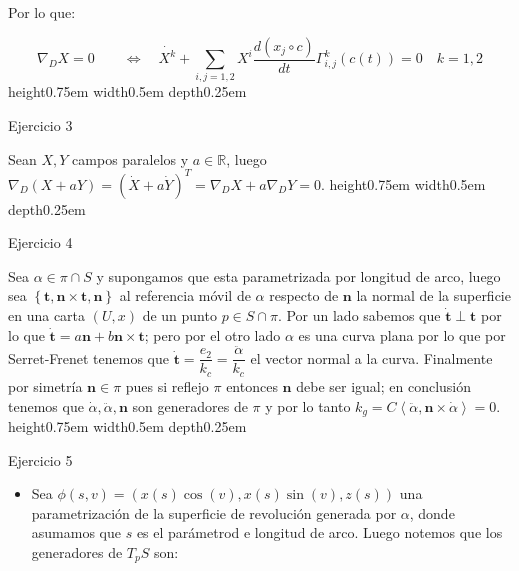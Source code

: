 \documentclass[11pt]{article}
\newcommand{\R}{{\mathbb{R}}}
\newcommand\ip[1]{\left\langle#1\right\rangle}
\renewcommand\tt{\mathbf{t}}
\newcommand\nn{\mathbf{n}}
\newcommand{\sett}[1]{\left\lbrace#1\right\rbrace}
\newcommand{\Bigsum}[2]{\sum\limits_{#1}{#2}}
\newenvironment{proof}[1][Demostraci\'on]{\begin{trivlist}
		\item[\hskip \labelsep {\bfseries #1}]}{\end{trivlist}}
\newcommand{\qed}{\nobreak \ifvmode \relax \else
	\ifdim\lastskip<1.5em \hskip-\lastskip
	\hskip1.5em plus0em minus0.5em \fi \nobreak
	\vrule height0.75em width0.5em depth0.25em\fi}
\begin{document}
\begin{enumerate}
\begin{proof}
		Por lo que:
		
		
		\begin{equation*}
		\nabla_D X = 0 \qquad \Longleftrightarrow \quad \dot{X^k} + \Bigsum{i,j = 1,2}{ X^i \dfrac{d(x_j \circ c)}{dt} \Gamma_{i,j}^{k}(c(t))} = 0 \quad k = 1,2
		\end{equation*}
		\qed
		
	\end{proof}
	
	\item Ejercicio 3
	
	\label{Ejercicio 3}
	
	\begin{proof}
		
		Sean $X,Y$ campos paralelos y $a \in \R$, luego $\nabla_D (X + aY) = (\dot{X} + a \dot{Y})^{T} = \nabla_D X + a \nabla_D Y = 0$. \qed
		
	\end{proof}
	
	\item Ejercicio 4
	
	\label{Ejercicio 4}
	
	\begin{proof}
		
		Sea $\alpha \in \pi \cap S$ y supongamos que esta parametrizada por longitud de arco, luego sea $\sett{\tt,\nn \times \tt, \nn}$ al referencia m\'ovil de $\alpha$ respecto de $\nn$ la normal de la superficie en una carta $(U,x)$ de un punto $p \in S \cap \pi$. Por un lado sabemos que $\dot{\tt} \perp \tt$ por lo que $\dot{\tt} = a \nn + b \nn \times \tt$; pero por el otro lado $\alpha$ es una curva plana por lo que por Serret-Frenet tenemos que $\dot{\tt} = \dfrac{e_2}{k_c} = \dfrac{\ddot{\alpha}}{k_c}$ el vector normal a la curva. Finalmente por simetr\'ia $\nn \in \pi$ pues si reflejo $\pi$ entonces $\nn$ debe ser igual; en conclusi\'on tenemos que $\dot{\alpha},\ddot{\alpha},\nn$ son generadores de $\pi$ y por lo tanto $k_g = C\ip{\ddot{\alpha} , \nn \times \dot{\alpha}} = 0$. \qed
		
	\end{proof}
	
	\item Ejercicio 5
	
	\label{Ejercicio 5}
	
	\begin{proof}
		
		\begin{itemize}
			\item 		Sea $\phi(s,v) = \left(x(s)\cos(v) , x(s) \sin(v) , z(s)\right)$ una parametrizaci\'on de la superficie de revoluci\'on generada por $\alpha$, donde asumamos que $s$ es el par\'ametrod e longitud de arco. Luego notemos que los generadores de $T_pS$ son:
		

\end{itemize}
\end{proof}
\end{enumerate}
\end{document}
